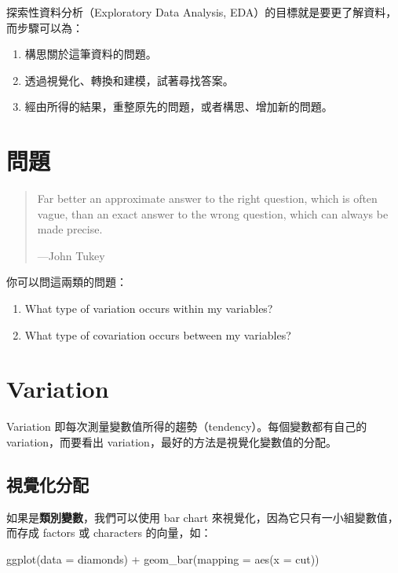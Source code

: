 \documentclass[
]{book}
\newenvironment{Shaded}{\begin{snugshade}}{\end{snugshade}}
\newcommand{\AttributeTok}[1]{\textcolor[rgb]{0.77,0.63,0.00}{#1}}
\newcommand{\FunctionTok}[1]{\textcolor[rgb]{0.00,0.00,0.00}{#1}}
\newcommand{\NormalTok}[1]{#1}
\newcommand{\SpecialCharTok}[1]{\textcolor[rgb]{0.00,0.00,0.00}{#1}}
\theoremstyle{definition}
\theoremstyle{remark}
\begin{document}
探索性資料分析（Exploratory Data Analysis, EDA）的目標就是要更了解資料，而步驟可以為：

\begin{enumerate}
\def\labelenumi{\arabic{enumi}.}
\item
  構思關於這筆資料的問題。
\item
  透過視覺化、轉換和建模，試著尋找答案。
\item
  經由所得的結果，重整原先的問題，或者構思、增加新的問題。
\end{enumerate}

\hypertarget{ux554fux984c}{%
\section{問題}\label{ux554fux984c}}

\begin{quote}
Far better an approximate answer to the right question, which is often vague, than an exact answer to the wrong question, which can always be made precise.

---John Tukey
\end{quote}

你可以問這兩類的問題：

\begin{enumerate}
\def\labelenumi{\arabic{enumi}.}
\item
  What type of variation occurs within my variables?
\item
  What type of covariation occurs between my variables?
\end{enumerate}

\hypertarget{variation}{%
\section{Variation}\label{variation}}

Variation 即每次測量變數值所得的趨勢（tendency）。每個變數都有自己的 variation，而要看出 variation，最好的方法是視覺化變數值的分配。

\hypertarget{ux8996ux89baux5316ux5206ux914d}{%
\subsection{視覺化分配}\label{ux8996ux89baux5316ux5206ux914d}}

如果是\textbf{類別變數}，我們可以使用 bar chart 來視覺化，因為它只有一小組變數值，而存成 factors 或 characters 的向量，如：

\begin{Shaded}
\begin{Highlighting}[]
\FunctionTok{ggplot}\NormalTok{(}\AttributeTok{data =}\NormalTok{ diamonds) }\SpecialCharTok{+}
  \FunctionTok{geom\_bar}\NormalTok{(}\AttributeTok{mapping =} \FunctionTok{aes}\NormalTok{(}\AttributeTok{x =}\NormalTok{ cut))}
\end{Highlighting}
\end{Shaded}
\end{document}
